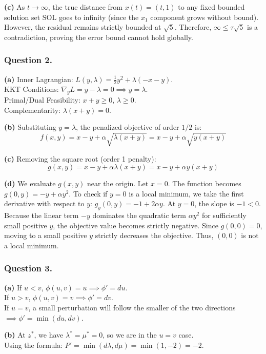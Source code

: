 \documentclass[pdflatex,sn-mathphys-num]{sn-jnl}%
\theoremstyle{definition}
\begin{document}
\textbf{(c)} As $t \to \infty$, the true distance from $x(t) = (t, 1)$ to any fixed bounded solution set $\text{SOL}$ goes to infinity (since the $x_1$ component grows without bound). However, the residual remains strictly bounded at $\sqrt{5}$. Therefore, $\infty \le \tau \sqrt{5}$ is a contradiction, proving the error bound cannot hold globally.

\subsubsection{Question 2.}
\textbf{(a)} Inner Lagrangian: $L(y, \lambda) = \frac{1}{2}y^2 + \lambda(-x - y)$. \\
KKT Conditions: $\nabla_y L = y - \lambda = 0 \implies y = \lambda$. \\
Primal/Dual Feasibility: $x + y \ge 0$, $\lambda \ge 0$. \\
Complementarity: $\lambda(x+y) = 0$.

\textbf{(b)} Substituting $y = \lambda$, the penalized objective of order $1/2$ is:
$$ f(x,y) = x - y + \alpha \sqrt{\lambda(x+y)} = x - y + \alpha \sqrt{y(x+y)} $$

\textbf{(c)} Removing the square root (order 1 penalty):
$$ g(x,y) = x - y + \alpha \lambda(x+y) = x - y + \alpha y(x+y) $$

\textbf{(d)} We evaluate $g(x,y)$ near the origin. Let $x = 0$. The function becomes $g(0,y) = -y + \alpha y^2$. 
To check if $y=0$ is a local minimum, we take the first derivative with respect to $y$: $g_y(0,y) = -1 + 2\alpha y$. At $y=0$, the slope is $-1 < 0$. 
Because the linear term $-y$ dominates the quadratic term $\alpha y^2$ for sufficiently small positive $y$, the objective value becomes strictly negative. Since $g(0,0) = 0$, moving to a small positive $y$ strictly decreases the objective. Thus, $(0,0)$ is not a local minimum.

\subsubsection{Question 3.}
\textbf{(a)} 
If $u < v$, $\phi(u,v) = u \implies \phi' = du$. \\
If $u > v$, $\phi(u,v) = v \implies \phi' = dv$. \\
If $u = v$, a small perturbation will follow the smaller of the two directions $\implies \phi' = \min(du, dv)$.

\textbf{(b)} At $z^*$, we have $\lambda^* = \mu^* = 0$, so we are in the $u = v$ case. \\
Using the formula: $P' = \min(d\lambda, d\mu) = \min(1, -2) = -2$.
\end{document}
